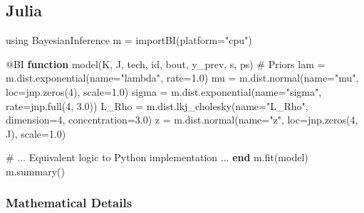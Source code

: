 \documentclass[
  letterpaper,
  DIV=11,
  numbers=noendperiod]{scrartcl}
\newenvironment{Shaded}{\begin{snugshade}}{\end{snugshade}}
\newcommand{\BuiltInTok}[1]{\textcolor[rgb]{0.00,0.23,0.31}{#1}}
\newcommand{\CommentTok}[1]{\textcolor[rgb]{0.37,0.37,0.37}{#1}}
\newcommand{\FloatTok}[1]{\textcolor[rgb]{0.68,0.00,0.00}{#1}}
\newcommand{\FunctionTok}[1]{\textcolor[rgb]{0.28,0.35,0.67}{#1}}
\newcommand{\ImportTok}[1]{\textcolor[rgb]{0.00,0.46,0.62}{#1}}
\newcommand{\KeywordTok}[1]{\textcolor[rgb]{0.00,0.23,0.31}{\textbf{#1}}}
\newcommand{\NormalTok}[1]{\textcolor[rgb]{0.00,0.23,0.31}{#1}}
\newcommand{\OperatorTok}[1]{\textcolor[rgb]{0.37,0.37,0.37}{#1}}
\newcommand{\PreprocessorTok}[1]{\textcolor[rgb]{0.68,0.00,0.00}{#1}}
\newcommand{\StringTok}[1]{\textcolor[rgb]{0.13,0.47,0.30}{#1}}
\begin{document}
\subsection{Julia}

\begin{Shaded}
\begin{Highlighting}[]
\ImportTok{using} \BuiltInTok{BayesianInference}
\NormalTok{m }\OperatorTok{=} \FunctionTok{importBI}\NormalTok{(platform}\OperatorTok{=}\StringTok{"cpu"}\NormalTok{)}

\PreprocessorTok{@BI} \KeywordTok{function} \FunctionTok{model}\NormalTok{(K, J, tech, id, bout, y\_prev, s, ps)}
    \CommentTok{\# Priors}
\NormalTok{    lam }\OperatorTok{=}\NormalTok{ m.dist.}\FunctionTok{exponential}\NormalTok{(name}\OperatorTok{=}\StringTok{"lambda"}\NormalTok{, rate}\OperatorTok{=}\FloatTok{1.0}\NormalTok{)}
\NormalTok{    mu }\OperatorTok{=}\NormalTok{ m.dist.}\FunctionTok{normal}\NormalTok{(name}\OperatorTok{=}\StringTok{"mu"}\NormalTok{, loc}\OperatorTok{=}\NormalTok{jnp.}\FunctionTok{zeros}\NormalTok{(}\FloatTok{4}\NormalTok{), scale}\OperatorTok{=}\FloatTok{1.0}\NormalTok{)}
\NormalTok{    sigma }\OperatorTok{=}\NormalTok{ m.dist.}\FunctionTok{exponential}\NormalTok{(name}\OperatorTok{=}\StringTok{"sigma"}\NormalTok{, rate}\OperatorTok{=}\NormalTok{jnp.}\FunctionTok{full}\NormalTok{(}\FloatTok{4}\NormalTok{, }\FloatTok{3.0}\NormalTok{))}
\NormalTok{    L\_Rho }\OperatorTok{=}\NormalTok{ m.dist.}\FunctionTok{lkj\_cholesky}\NormalTok{(name}\OperatorTok{=}\StringTok{"L\_Rho"}\NormalTok{, dimension}\OperatorTok{=}\FloatTok{4}\NormalTok{, concentration}\OperatorTok{=}\FloatTok{3.0}\NormalTok{)}
\NormalTok{    z }\OperatorTok{=}\NormalTok{ m.dist.}\FunctionTok{normal}\NormalTok{(name}\OperatorTok{=}\StringTok{"z"}\NormalTok{, loc}\OperatorTok{=}\NormalTok{jnp.}\FunctionTok{zeros}\NormalTok{(}\FloatTok{4}\NormalTok{, J), scale}\OperatorTok{=}\FloatTok{1.0}\NormalTok{)}

    \CommentTok{\# ... Equivalent logic to Python implementation ...}
\KeywordTok{end}
\NormalTok{m.}\FunctionTok{fit}\NormalTok{(model)}
\NormalTok{m.}\FunctionTok{summary}\NormalTok{()}
\end{Highlighting}
\end{Shaded}

\subsubsection{Mathematical Details}\label{mathematical-details}
\end{document}
